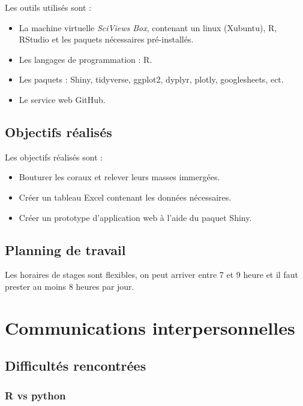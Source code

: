 \documentclass[]{report}
\begin{document}
Les outils utilisés sont :

\begin{itemize}
\item
  La machine virtuelle \emph{SciViews Box}, contenant un linux
  (Xubuntu), R, RStudio et les paquets nécessaires pré-installés.
\item
  Les langages de programmation : R.
\item
  Les paquets : Shiny, tidyverse, ggplot2, dyplyr, plotly, googlesheets,
  ect.
\item
  Le service web GitHub.
\end{itemize}

\section{Objectifs réalisés}\label{objectifs-realises}

Les objectifs réalisés sont :

\begin{itemize}
\item
  Bouturer les coraux et relever leurs masses immergées.
\item
  Créer un tableau Excel contenant les données nécessaires.
\item
  Créer un prototype d'application web à l'aide du paquet Shiny.
\end{itemize}

\section{Planning de travail}\label{planning-de-travail}

Les horaires de stages sont flexibles, on peut arriver entre 7 et 9
heure et il faut prester au moins 8 heures par jour.

\chapter{Communications
interpersonnelles}\label{communications-interpersonnelles}

\section{Difficultés rencontrées}\label{difficultes-rencontrees}

\subsection{R vs python}\label{r-vs-python}
\end{document}
